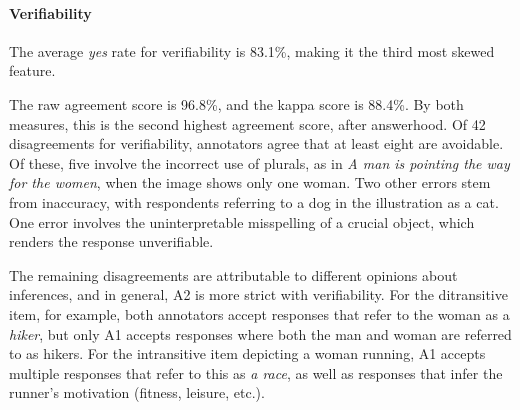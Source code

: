 \documentclass[11pt,a4paper]{article}
\begin{document}
\paragraph{Verifiability} The average \textit{yes} rate for verifiability is 83.1\%, making it the third most skewed feature.

The raw agreement score is 96.8\%, and the kappa score is 88.4\%. By both measures, this is the second highest agreement score, after answerhood. Of 42 disagreements for verifiability, annotators agree that at least eight are avoidable. Of these, five involve the incorrect use of plurals, as in \textit{A man is pointing the way for the women}, when the image shows only one woman. Two other errors stem from inaccuracy, with respondents referring to a dog in the illustration as a cat. One error involves the uninterpretable misspelling of a crucial object, which renders the response unverifiable.

The remaining disagreements are attributable to different opinions about inferences, and in general, A2 is more strict with verifiability.  For the ditransitive item, for example, both annotators accept responses that refer to the woman as a \textit{hiker}, but only A1 accepts responses where both the man and woman are referred to as hikers. For the intransitive item depicting a woman running, A1 accepts multiple responses that refer to this as \textit{a race}, as well as responses that infer the runner's motivation (fitness, leisure, etc.).
\end{document}
